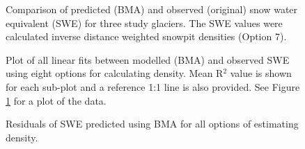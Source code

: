 \documentclass[12pt]{article}
\begin{document}
\begin{figure}[H]
	\caption{Comparison of predicted (BMA) and observed (original) snow water equivalent (SWE) for three study glaciers. The SWE values were calculated inverse distance weighted snowpit densities (Option 7).}
	\label{fig:BMSfit_opt8}
\end{figure}

\begin{figure}[H]
	\caption{Plot of all linear fits between modelled (BMA) and observed SWE using eight options for calculating density. Mean R$^2$ value is shown for each sub-plot and a reference 1:1 line is also provided. See Figure \ref{fig:BMSfit_opt8} for a plot of the data. }
	\label{fig:BMSfit_allLines}
\end{figure}

\begin{figure}[H]
	\caption{Residuals of SWE predicted using BMA for all options of estimating density.}
	\label{fig:BMSresiduals_all}
\end{figure}
\end{document}
